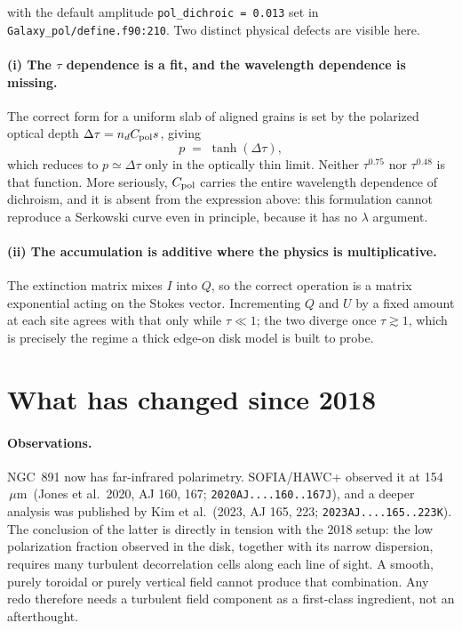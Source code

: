 \documentclass{my_memo}
\newcommand{\code}[1]{\texttt{#1}}
\newcommand{\um}{\ensuremath{\,\mu\mathrm{m}}}
\newcommand{\Cpol}{\ensuremath{C_{\rm pol}}}
\begin{document}
with the default amplitude \code{pol\_dichroic = 0.013} set in
\code{Galaxy\_pol/define.f90:210}. Two distinct physical defects are
visible here.

\paragraph{(i) The $\tau$ dependence is a fit, and the wavelength
dependence is missing.} The correct form for a uniform slab of aligned
grains is set by the polarized optical depth
$\Delta\tau = n_d \Cpol s$, giving
\begin{equation}
  p \;=\; \tanh(\Delta\tau),
  \label{eq:tanh}
\end{equation}
which reduces to $p \simeq \Delta\tau$ only in the optically thin limit.
Neither $\tau^{0.75}$ nor $\tau^{0.48}$ is that function. More seriously,
$\Cpol$ carries the entire wavelength dependence of dichroism, and it is
absent from the expression above: this formulation cannot reproduce a
Serkowski curve even in principle, because it has no $\lambda$ argument.

\paragraph{(ii) The accumulation is additive where the physics is
multiplicative.} The extinction matrix mixes $I$ into $Q$, so the correct
operation is a matrix exponential acting on the Stokes vector.
Incrementing $Q$ and $U$ by a fixed amount at each site agrees with that
only while $\tau \ll 1$; the two diverge once $\tau \gtrsim 1$, which is
precisely the regime a thick edge-on disk model is built to probe.

\section{What has changed since 2018}
\label{sec:since2018}

\paragraph{Observations.} NGC~891 now has far-infrared polarimetry.
SOFIA/HAWC+ observed it at 154\um\ (Jones et al.\ 2020, AJ 160, 167;
\code{2020AJ....160..167J}), and a deeper analysis was published by Kim
et al.\ (2023, AJ 165, 223; \code{2023AJ....165..223K}). The conclusion
of the latter is directly in tension with the 2018 setup: the low
polarization fraction observed in the disk, together with its narrow
dispersion, requires many turbulent decorrelation cells along each line
of sight. A smooth, purely toroidal or purely vertical field cannot
produce that combination. Any redo therefore needs a turbulent field
component as a first-class ingredient, not an afterthought.
\end{document}
